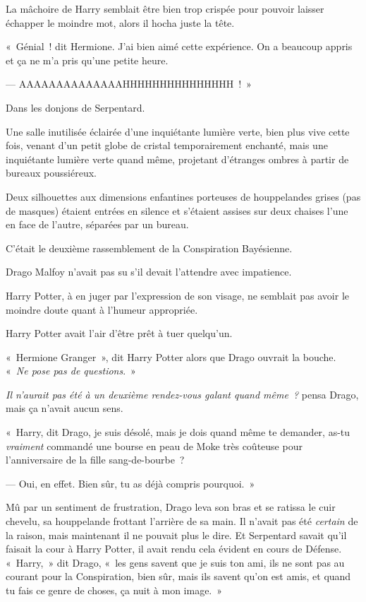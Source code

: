 La mâchoire de Harry semblait être bien trop crispée pour pouvoir laisser échapper le moindre mot, alors il hocha juste la tête.

«~Génial~! dit Hermione. J'ai bien aimé cette expérience. On a beaucoup appris et ça ne m'a pris qu'une petite heure.

--- AAAAAAAAAAAAAAHHHHHHHHHHHHHHH~!~»

\later

Dans les donjons de Serpentard.

Une salle inutilisée éclairée d'une inquiétante lumière verte, bien plus vive cette fois, venant d'un petit globe de cristal temporairement enchanté, mais une inquiétante lumière verte quand même, projetant d'étranges ombres à partir de bureaux poussiéreux.

Deux silhouettes aux dimensions enfantines porteuses de houppelandes grises (pas de masques) étaient entrées en silence et s'étaient assises sur deux chaises l'une en face de l'autre, séparées par un bureau.

C'était le deuxième rassemblement de la Conspiration Bayésienne.

Drago Malfoy n'avait pas su s'il devait l'attendre avec impatience.

Harry Potter, à en juger par l'expression de son visage, ne semblait pas avoir le moindre doute quant à l'humeur appropriée.

Harry Potter avait l'air d'être prêt à tuer quelqu'un.

«~Hermione Granger~», dit Harry Potter alors que Drago ouvrait la bouche. «~\emph{Ne pose pas de questions}.~»

\emph{Il n'aurait pas été à un deuxième rendez-vous galant quand même~?} pensa Drago, mais ça n'avait aucun sens.

«~Harry, dit Drago, je suis désolé, mais je dois quand même te demander, as-tu \emph{vraiment} commandé une bourse en peau de Moke très coûteuse pour l'anniversaire de la fille sang-de-bourbe~?

--- Oui, en effet. Bien sûr, tu as déjà compris pourquoi.~»

Mû par un sentiment de frustration, Drago leva son bras et se ratissa le cuir chevelu, sa houppelande frottant l'arrière de sa main. Il n'avait pas été \emph{certain} de la raison, mais maintenant il ne pouvait plus le dire. Et Serpentard savait qu'il faisait la cour à Harry Potter, il avait rendu cela évident en cours de Défense. «~Harry,~» dit Drago, «~les gens savent que je suis ton ami, ils ne sont pas au courant pour la Conspiration, bien sûr, mais ils savent qu'on est amis, et quand tu fais ce genre de choses, ça nuit à mon image.~»

